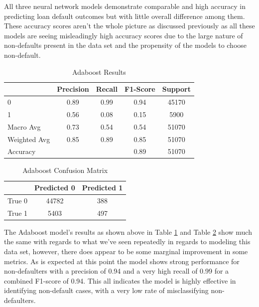 \documentclass[12pt]{article}
\begin{document}
All three neural network models demonstrate comparable and high accuracy in predicting loan default outcomes but with little overall difference among them. These accuracy scores aren't the whole picture as discussed previously as all these models are seeing misleadingly high accuracy scores due to the large nature of non-defaults present in the data set and the propensity of the models to choose non-default.

\begin{table}[htbp]
    \centering
    \caption{Adaboost Results}
    \begin{tabular}{lcccc}
        \toprule
        & Precision & Recall & F1-Score & Support \\
        \midrule
        0 & 0.89 & 0.99 & 0.94 & 45170 \\
        1 & 0.56 & 0.08 & 0.15 & 5900 \\
        Macro Avg & 0.73 & 0.54 & 0.54 & 51070 \\
        Weighted Avg & 0.85 & 0.89 & 0.85 & 51070 \\
        \midrule
        Accuracy & & & 0.89 & 51070 \\
        \bottomrule
    \end{tabular}
    \label{table:adaboostResults}
\end{table}

\begin{table}[htbp]
    \centering
    \caption{Adaboost Confusion Matrix}
    \begin{tabular}{lcc}
        \toprule
        & Predicted 0 & Predicted 1 \\
        \midrule
        True 0 & 44782 & 388 \\
        True 1 & 5403 & 497 \\
        \bottomrule
    \end{tabular}
    \label{table:adaboostConfusionMatrix}
\end{table}

The Adaboost model's results as shown above in Table \ref{table:adaboostResults} and Table \ref{table:adaboostConfusionMatrix} show much the same with regards to what we've seen repeatedly in regards to modeling this data set, however, there does appear to be some marginal improvement in some metrics. As is expected at this point the model shows strong performance for non-defaulters with a precision of 0.94 and a very high recall of 0.99 for a combined F1-score of 0.94. This all indicates the model is highly effective in identifying non-default cases, with a very low rate of misclassifying non-defaulters.
\end{document}
